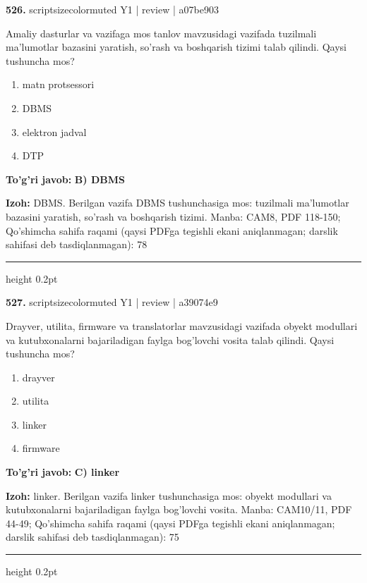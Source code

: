 \documentclass[10pt,a4paper]{article}
\begin{document}
{\bfseries\sffamily\color{ink} 526.} {scriptsizecolor{muted} Y1 | review | a07be903}
\par
Amaliy dasturlar va vazifaga mos tanlov mavzusidagi vazifada tuzilmali ma'lumotlar bazasini yaratish, so'rash va boshqarish tizimi talab qilindi. Qaysi tushuncha mos?
\begin{enumerate}[label=\Alph*),leftmargin=9mm]
\item matn protsessori
\item DBMS
\item elektron jadval
\item DTP
\end{enumerate}
\begin{tcolorbox}[enhanced,breakable,colback=teal!4,colframe=teal!60!black,boxrule=0.45pt,arc=1.2mm,left=2.7mm,right=2.7mm,top=1.8mm,bottom=1.8mm,before skip=2mm,after skip=2mm]
{\bfseries\sffamily\color{teal}To'g'ri javob:} \textbf{B) DBMS}
\par\smallskip
{\bfseries Izoh:} DBMS. Berilgan vazifa DBMS tushunchasiga mos: tuzilmali ma'lumotlar bazasini yaratish, so'rash va boshqarish tizimi. Manba: CAM8, PDF 118-150; Qo'shimcha sahifa raqami (qaysi PDFga tegishli ekani aniqlanmagan; darslik sahifasi deb tasdiqlanmagan): 78
\end{tcolorbox}
\vspace{2mm}\hrule height 0.2pt\vspace{3mm}

{\bfseries\sffamily\color{ink} 527.} {scriptsizecolor{muted} Y1 | review | a39074e9}
\par
Drayver, utilita, firmware va translatorlar mavzusidagi vazifada obyekt modullari va kutubxonalarni bajariladigan faylga bog'lovchi vosita talab qilindi. Qaysi tushuncha mos?
\begin{enumerate}[label=\Alph*),leftmargin=9mm]
\item drayver
\item utilita
\item linker
\item firmware
\end{enumerate}
\begin{tcolorbox}[enhanced,breakable,colback=teal!4,colframe=teal!60!black,boxrule=0.45pt,arc=1.2mm,left=2.7mm,right=2.7mm,top=1.8mm,bottom=1.8mm,before skip=2mm,after skip=2mm]
{\bfseries\sffamily\color{teal}To'g'ri javob:} \textbf{C) linker}
\par\smallskip
{\bfseries Izoh:} linker. Berilgan vazifa linker tushunchasiga mos: obyekt modullari va kutubxonalarni bajariladigan faylga bog'lovchi vosita. Manba: CAM10/11, PDF 44-49; Qo'shimcha sahifa raqami (qaysi PDFga tegishli ekani aniqlanmagan; darslik sahifasi deb tasdiqlanmagan): 75
\end{tcolorbox}
\vspace{2mm}\hrule height 0.2pt\vspace{3mm}
\end{document}
